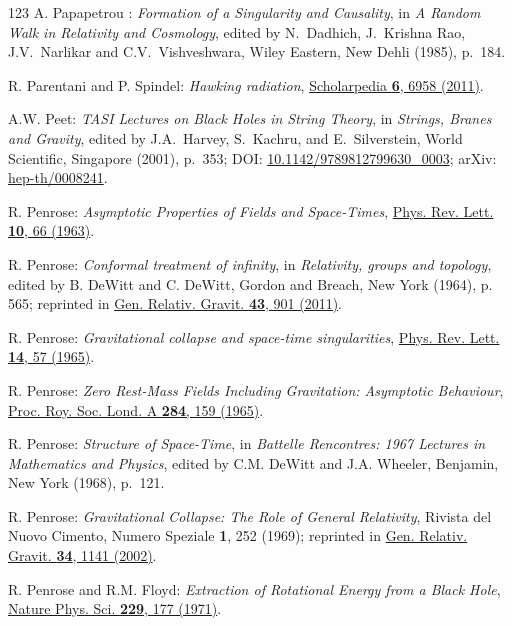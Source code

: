 \begin{thebibliography}{123}
A. Papapetrou : {\em Formation of a Singularity and Causality},
in {\em A Random Walk in Relativity and Cosmology},
edited by N.~Dadhich, J.~Krishna Rao, J.V.~Narlikar and C.V.~Vishveshwara,
Wiley Eastern, New Dehli (1985), p.~184.

R. Parentani and P. Spindel:
{\em Hawking radiation},
\href{https://doi.org/10.4249/scholarpedia.6958}{Scholarpedia {\bf 6}, 6958 (2011)}.

A.W. Peet:
{\em TASI Lectures on Black Holes in String Theory},
in {\em Strings, Branes and Gravity}, edited by
J.A.~Harvey, S.~Kachru, and E.~Silverstein,
World Scientific, Singapore (2001), p.~353;
DOI: \href{https://doi.org/10.1142/9789812799630_0003}{10.1142/9789812799630\_0003};
arXiv: \href{https://arxiv.org/abs/hep-th/0008241}{hep-th/0008241}.

R. Penrose: {\em Asymptotic Properties of Fields and Space-Times},
\href{https://doi.org/10.1103/PhysRevLett.10.66}{Phys. Rev. Lett. {\bf 10}, 66 (1963)}.

R. Penrose: {\em Conformal treatment of infinity}, in {\em Relativity, groups and topology},
edited by B. DeWitt and C. DeWitt,
Gordon and Breach, New York (1964), p. 565; reprinted in
\href{https://doi.org/10.1007/s10714-010-1110-5}{Gen. Relativ. Gravit. {\bf 43}, 901 (2011)}.

R. Penrose: {\em Gravitational collapse and space-time singularities},
\href{https://doi.org/10.1103/PhysRevLett.14.57}{Phys. Rev. Lett. {\bf 14}, 57 (1965)}.

R. Penrose:
{\em Zero Rest-Mass Fields Including Gravitation: Asymptotic Behaviour},
\href{https://doi.org/10.1098/rspa.1965.0058}{Proc. Roy. Soc. Lond. A {\bf 284}, 159 (1965)}.

R. Penrose: {\em Structure of Space-Time},
in {\em Battelle Rencontres: 1967 Lectures in Mathematics and Physics},
edited by C.M. DeWitt and J.A. Wheeler,
Benjamin, New York (1968), p.~121.

R. Penrose: {\em Gravitational Collapse: The Role of General Relativity},
Rivista del Nuovo Cimento, Numero Speziale {\bf 1}, 252 (1969); reprinted in
\href{https://doi.org/10.1023/A:1016578408204}{Gen. Relativ. Gravit. {\bf 34}, 1141 (2002)}.

R. Penrose and R.M. Floyd:
{\em Extraction of Rotational Energy from a Black Hole},
\href{https://doi.org/10.1038/physci229177a0}{Nature Phys. Sci. {\bf 229}, 177 (1971)}.


\end{thebibliography}
